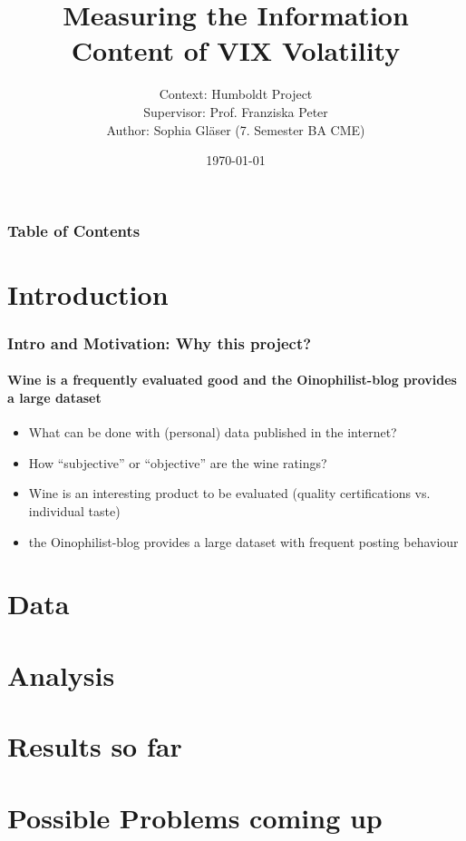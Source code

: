 \documentclass[aspectratio=169]{beamer}
\title{Measuring the Information Content of VIX Volatility}
\author{Context: Humboldt Project\\
Supervisor: Prof. Franziska Peter\\
Author: Sophia Gläser (7. Semester BA CME)}
\date{\small \today}
\begin{document}
\begin{frame}
\maketitle
\end{frame}

\begin{frame}
\frametitle{Table of Contents}
\tableofcontents
\end{frame}

\section{Introduction}

\begin{frame}
\frametitle{Intro and Motivation: Why this project?}
\framesubtitle{Wine is a frequently evaluated good and the Oinophilist-blog provides a large dataset}
	\begin{itemize}
	\item<1->  What can be done with (personal) data published in the internet?
	\item<1->  How ``subjective'' or ``objective'' are the wine ratings?
	\end{itemize}
	\begin{itemize}
	\item<2->  Wine is an interesting product to be evaluated (quality certifications vs. individual taste)
	\item<2->  the Oinophilist-blog provides a large dataset with frequent posting behaviour
	\end{itemize}
\end{frame}

\section{Data}


\section{Analysis}


\section{Results so far}


\section{Possible Problems coming up}
\end{document}
